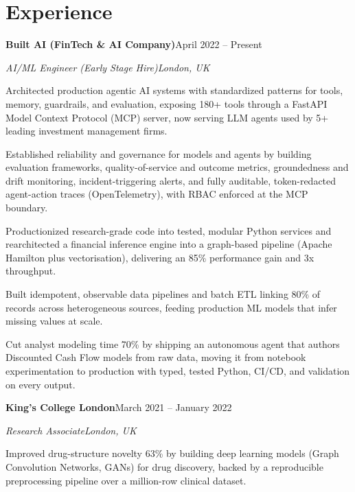 \documentclass[10pt,a4paper]{article}
\newcommand{\entry}[4]{%
  {\color{company}\bfseries #1}\hfill {\color{muted}#2}\par
  \vspace{1pt}
  {\itshape #3}\hfill {\color{muted}\itshape #4}\par
  \vspace{3pt}%
}
\begin{document}
\section{Experience}
\entry{Built AI (FinTech \& AI Company)}{April 2022 -- Present}{AI/ML Engineer (Early Stage Hire)}{London, UK}
\begin{tight}
  \item Architected production agentic AI systems with standardized patterns for tools, memory, guardrails, and evaluation, exposing 180+ tools through a FastAPI Model Context Protocol (MCP) server, now serving LLM agents used by 5+ leading investment management firms.
  \item Established reliability and governance for models and agents by building evaluation frameworks, quality-of-service and outcome metrics, groundedness and drift monitoring, incident-triggering alerts, and fully auditable, token-redacted agent-action traces (OpenTelemetry), with RBAC enforced at the MCP boundary.
  \item Productionized research-grade code into tested, modular Python services and rearchitected a financial inference engine into a graph-based pipeline (Apache Hamilton plus vectorisation), delivering an 85\% performance gain and 3x throughput.
  \item Built idempotent, observable data pipelines and batch ETL linking 80\% of records across heterogeneous sources, feeding production ML models that infer missing values at scale.
  \item Cut analyst modeling time 70\% by shipping an autonomous agent that authors Discounted Cash Flow models from raw data, moving it from notebook experimentation to production with typed, tested Python, CI/CD, and validation on every output.
\end{tight}

\entry{King's College London}{March 2021 -- January 2022}{Research Associate}{London, UK}
\begin{tight}
  \item Improved drug-structure novelty 63\% by building deep learning models (Graph Convolution Networks, GANs) for drug discovery, backed by a reproducible preprocessing pipeline over a million-row clinical dataset.
\end{tight}

\end{document}
